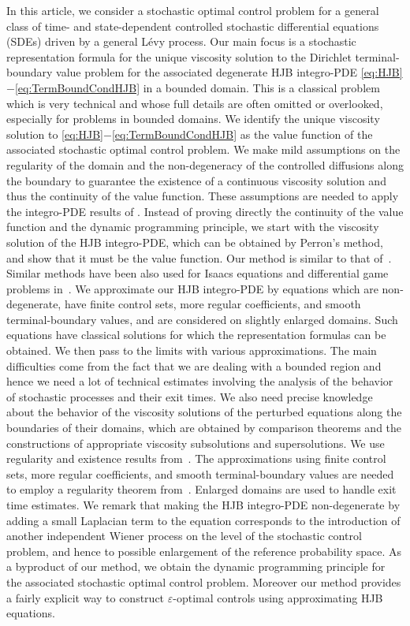 \documentclass[amscd,amssymb,11pt]{article}
\numberwithin{theorem}{section}
\numberwithin{equation}{section}
\begin{document}
In this article, we consider a stochastic optimal control problem for a general class of time- and state-dependent controlled stochastic differential equations (SDEs) driven by a general L\'{e}vy process. Our main focus is a stochastic representation formula for the unique viscosity solution to the Dirichlet terminal-boundary value problem for the associated degenerate HJB integro-PDE \eqref{eq:HJB}$-$\eqref{eq:TermBoundCondHJB} in a bounded domain. This is a classical problem which is very technical and whose full details are often omitted or overlooked, especially for problems in bounded domains. We identify the unique viscosity solution to \eqref{eq:HJB}$-$\eqref{eq:TermBoundCondHJB} as the value function of the associated stochastic optimal control problem. We make mild assumptions on the regularity of the domain and the non-degeneracy of the controlled diffusions along the boundary to guarantee the existence of a continuous viscosity solution and thus the continuity of the value function. These assumptions are needed to apply the integro-PDE results of
\cite{Mou1:2016}. Instead of proving directly the continuity of the value function and the dynamic programming principle, we start with the viscosity solution of the HJB integro-PDE, which can be obtained by Perron's method, and show that it must be the value function. Our method is similar to that of~\cite{FlemingSoner:2006}. Similar methods have been also used for Isaacs equations and differential game problems in~\cite{KoikeSwiech:2013,Swiech:1996}. We approximate our HJB integro-PDE by equations which are non-degenerate, have finite control sets, more regular coefficients, and smooth terminal-boundary values, and are considered on slightly enlarged domains. Such equations have classical solutions for which the representation formulas can be obtained. We then pass to the limits with various approximations. The main difficulties come from the fact that we are dealing with a bounded region and hence we need a lot of technical estimates involving the analysis of the behavior of stochastic processes and their exit times. We also need precise knowledge about the behavior of the viscosity solutions of the perturbed equations along the boundaries of their domains, which are obtained by comparison theorems and the constructions of appropriate viscosity subsolutions and supersolutions. We use regularity and existence results from~\cite{Mou:2017,Mou1:2016}.
The approximations using finite control sets, more regular coefficients, and smooth terminal-boundary values are needed to employ a regularity
theorem from~\cite{Mou1:2016}. Enlarged domains are used to handle exit time estimates. We remark that making the HJB integro-PDE non-degenerate by adding a small Laplacian term to the equation corresponds to the introduction of another independent Wiener process on the level of the stochastic control problem, and hence to possible enlargement of the reference probability space. As a byproduct of our method, we obtain the dynamic programming principle for the associated stochastic optimal control problem. Moreover our method provides a fairly explicit way to construct $\varepsilon$-optimal controls using approximating HJB equations.
\end{document}
